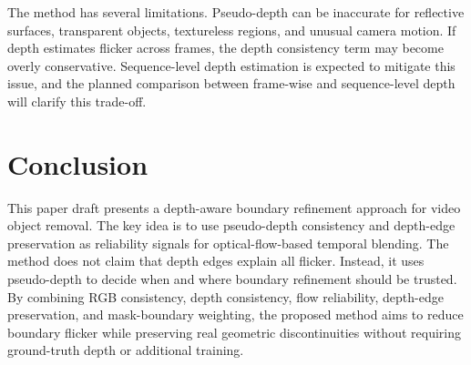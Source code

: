 \documentclass[nouppercase]{kaia}
\begin{document}
The method has several limitations. Pseudo-depth can be inaccurate for reflective surfaces, transparent objects, textureless regions, and unusual camera motion. If depth estimates flicker across frames, the depth consistency term may become overly conservative. Sequence-level depth estimation is expected to mitigate this issue, and the planned comparison between frame-wise and sequence-level depth will clarify this trade-off.

\section{Conclusion}
This paper draft presents a depth-aware boundary refinement approach for video object removal. The key idea is to use pseudo-depth consistency and depth-edge preservation as reliability signals for optical-flow-based temporal blending. The method does not claim that depth edges explain all flicker. Instead, it uses pseudo-depth to decide when and where boundary refinement should be trusted. By combining RGB consistency, depth consistency, flow reliability, depth-edge preservation, and mask-boundary weighting, the proposed method aims to reduce boundary flicker while preserving real geometric discontinuities without requiring ground-truth depth or additional training.



\newpage
\newpage
\end{document}
